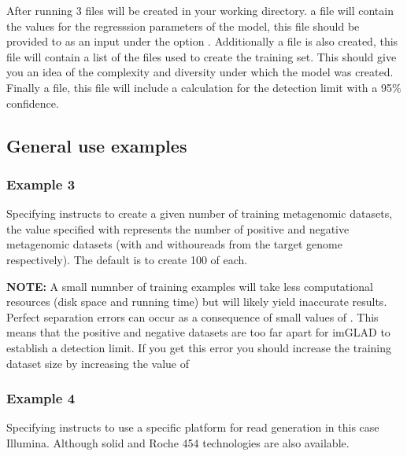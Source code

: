 \documentclass[letterpaper,10pt,english]{sphinxmanual}
\begin{document}
After running  3 files will be created in your working directory. a  file will contain the values for the regresssion parameters of the model, this file should be provided to  as an input under the option . Additionally a file  is also created, this file will contain a list of the files used to create the training set. This should give you an idea of the complexity and diversity under which the model was created. Finally a  file, this file will include a calculation for the detection limit with a 95\% confidence.


\subsection{General use examples}
\label{fitModel:general-use-examples}

\subsubsection{Example 3}
\label{fitModel:example-3}

Specifying  instructs  to create a given number of training metagenomic datasets, the value specified with  represents the number of positive and negative metagenomic datasets (with and withoureads from the target genome respectively). The default is to create 100 of each.

\textbf{NOTE:} A small numnber of training examples will take less computational resources (disk space and running time) but will likely yield inaccurate results. Perfect separation errors can occur as a consequence of small values of . This means that the positive and negative datasets are too far apart for imGLAD to establish a detection limit. If you get this error you should increase the training dataset size by increasing the value of 


\subsubsection{Example 4}
\label{fitModel:example-4}

Specifying  instructs  to use a specific platform for read generation in this case Illumina. Although solid and Roche 454 technologies are also available.
\end{document}
